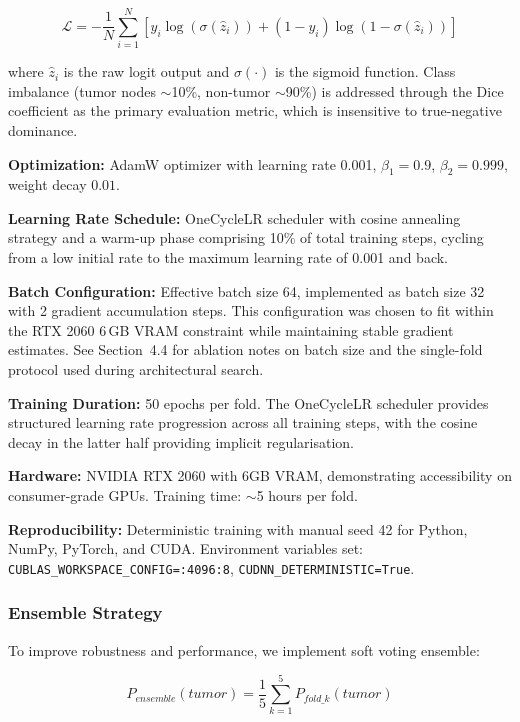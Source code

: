 \begin{equation}
\mathcal{L} = -\frac{1}{N} \sum_{i=1}^{N} \left[ y_i \log(\sigma(\hat{z}_i)) + (1-y_i) \log(1-\sigma(\hat{z}_i)) \right]
\end{equation}

where $\hat{z}_i$ is the raw logit output and $\sigma(\cdot)$ is the sigmoid function. Class imbalance (tumor nodes $\sim$10\%, non-tumor $\sim$90\%) is addressed through the Dice coefficient as the primary evaluation metric, which is insensitive to true-negative dominance.

\textbf{Optimization:} AdamW optimizer with learning rate 0.001, $\beta_1=0.9$, $\beta_2=0.999$, weight decay $0.01$.

\textbf{Learning Rate Schedule:} OneCycleLR scheduler with cosine annealing strategy and a warm-up phase comprising 10\% of total training steps, cycling from a low initial rate to the maximum learning rate of 0.001 and back.

\textbf{Batch Configuration:} Effective batch size 64, implemented as batch size 32 with 2 gradient accumulation steps. This configuration was chosen to fit within the RTX 2060 6\,GB VRAM constraint while maintaining stable gradient estimates. See Section~4.4 for ablation notes on batch size and the single-fold protocol used during architectural search.

\textbf{Training Duration:} 50 epochs per fold. The OneCycleLR scheduler provides structured learning rate progression across all training steps, with the cosine decay in the latter half providing implicit regularisation.

\textbf{Hardware:} NVIDIA RTX 2060 with 6GB VRAM, demonstrating accessibility on consumer-grade GPUs. Training time: $\sim$5 hours per fold.

\textbf{Reproducibility:} Deterministic training with manual seed 42 for Python, NumPy, PyTorch, and CUDA. Environment variables set: \texttt{CUBLAS\_WORKSPACE\_CONFIG=:4096:8}, \texttt{CUDNN\_DETERMINISTIC=True}.

\subsubsection{Ensemble Strategy}

To improve robustness and performance, we implement soft voting ensemble:

\begin{equation}
P_{ensemble}(tumor) = \frac{1}{5} \sum_{k=1}^{5} P_{fold\_k}(tumor)
\end{equation}

